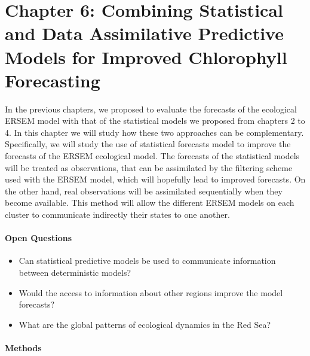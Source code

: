 \section{Chapter 6: Combining Statistical and Data Assimilative Predictive
Models for Improved Chlorophyll Forecasting}

In the previous chapters, we proposed to evaluate the forecasts of the
ecological ERSEM model with that of the statistical models we proposed from
chapters 2 to 4. In this chapter we will study how these two approaches can be
complementary. Specifically, we will study the use of statistical forecasts
model to improve the forecasts of the ERSEM ecological model. The forecasts of
the statistical models will be treated as observations, that can be assimilated
by the filtering scheme used with the ERSEM model, which will hopefully lead to
improved forecasts. On the other hand, real observations will be assimilated
sequentially when they become available. This method will allow the different
ERSEM models on each cluster to communicate indirectly their states to one
another. 

\paragraph{Open Questions}

\begin{itemize}

\item Can statistical predictive models be used to communicate information
between deterministic models?

\item Would the access to information about other regions improve the model
forecasts?

\item What are the global patterns of ecological dynamics in the Red Sea?

\end{itemize}

\paragraph{Methods}

